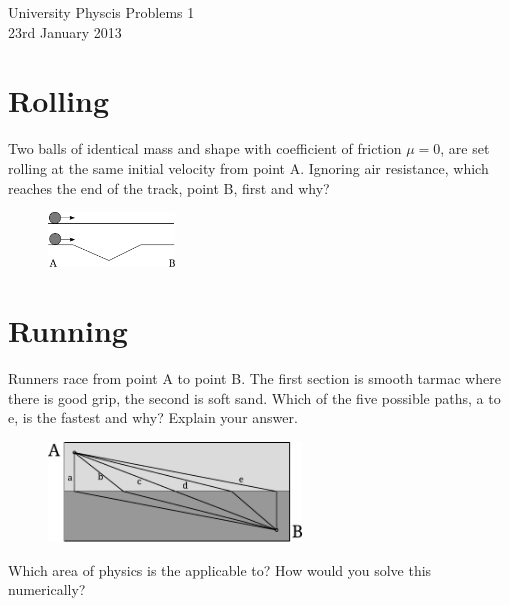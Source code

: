 
\makeatletter
\renewcommand{\@maketitle}{
\newpage
 \null
 \vskip 2em%
 \begin{center}%
  {\Large \@title \par}%
 \end{center}%
 \par} \makeatother

\begin{center}
\Huge University Physcis Problems 1\\[1em]
\large 23rd January 2013
\end{center}

\section{Rolling}
Two balls of identical mass and shape with coefficient of friction $\mu=0$, are set rolling at the same initial velocity from point A. Ignoring air resistance, which reaches the end of the track, point B, first and why?
\begin{figure}[ht]
  \centering
  \includegraphics[width=0.3\textwidth]{rolling_balls.pdf}
\end{figure}

\section{Running}
Runners race from point A to point B. The first section is smooth tarmac where there is good grip, the second is soft sand. Which of the five possible paths, a to e, is the fastest and why? Explain your answer.
\begin{figure}[ht]
  \centering
  \includegraphics[width=0.6\textwidth]{runners.pdf}
\end{figure}

Which area of physics is the applicable to? How would you solve this numerically?

